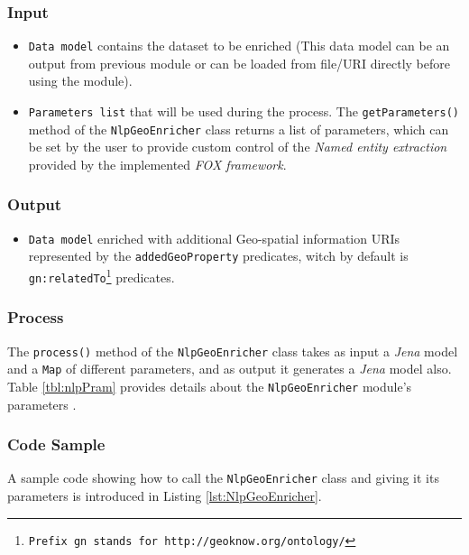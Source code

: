 \documentclass[a4paper,twoside,bibtotoc,abstracton,12pt,BCOR=15mm]{article}
\begin{document}
\subsubsection{Input}
\begin{itemize}
 \item \texttt{Data model} contains the dataset to be enriched 
 (This data model can be an output from previous module or can be loaded from file/URI directly before using the module). 
 \item \texttt{Parameters list} that will be used during the process. The \texttt{getParameters()} method of the \texttt{NlpGeoEnricher} class returns a list of parameters,
 which can be set by the user to provide custom control of the \emph{Named entity extraction} provided by the implemented \emph{FOX framework}.
\end{itemize}

\subsubsection{Output}
\begin{itemize}
 \item \texttt{Data model} enriched with additional Geo-spatial information URIs represented by the \texttt{addedGeoProperty} predicates, 
 witch by default is \texttt{gn:relatedTo\footnote{Prefix \texttt{gn} stands for \texttt{http://geoknow.org/ontology/}}} predicates.
\end{itemize}

\subsubsection{Process}
The \texttt{process()} method of the \texttt{NlpGeoEnricher} class takes as input a \emph{Jena} model and a \texttt{Map} of different parameters, 
and as output it generates a \emph{Jena} model also.
Table \ref{tbl:nlpPram} provides details about the \texttt{NlpGeoEnricher} module's parameters .

\subsubsection{Code Sample}
A sample code showing how to call the \texttt{NlpGeoEnricher} class and giving it its parameters is introduced in Listing \ref{lst:NlpGeoEnricher}.
\end{document}
